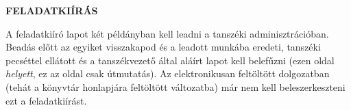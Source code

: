 \clearpage
\begin{center}
\large
\textbf{FELADATKIÍRÁS}\\
\end{center}

A feladatkiíró lapot két példányban kell leadni a tanszéki adminisztrációban. Beadás előtt az egyiket visszakapod és a leadott munkába eredeti, tanszéki pecséttel ellátott és a tanszékvezető által aláírt lapot kell belefűzni (ezen oldal \emph{helyett}, ez az oldal csak útmutatás). Az elektronikusan feltöltött dolgozatban (tehát a könyvtár honlapjára feltöltött változatba) már nem kell beleszerkeszteni ezt a feladatkiírást.
